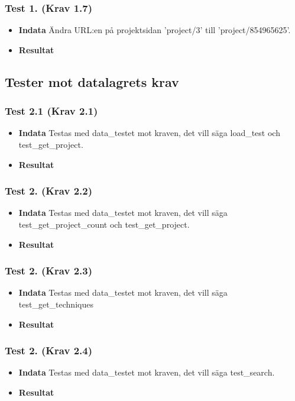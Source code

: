 \documentclass{TDP003mall}
\begin{document}
\subsubsection*{Test 1. (Krav 1.7)}
\begin{itemize}
\item[]\textbf{Indata} Ändra URL:en på projektsidan 'project/3' till 'project/854965625'.
\item[]\textbf{Resultat} 
\end{itemize}


\subsection{Tester mot datalagrets krav}
\subsubsection*{Test 2.1 (Krav 2.1)}
\begin{itemize}
\item[]\textbf{Indata} Testas med data\_testet mot kraven, det vill säga load\_test och test\_get\_project.
\item[]\textbf{Resultat} 
\end{itemize}
\subsubsection*{Test 2. (Krav 2.2)}
\begin{itemize}
\item[]\textbf{Indata} Testas med data\_testet mot kraven, det vill säga test\_get\_project\_count och test\_get\_project.
\item[]\textbf{Resultat} 
\end{itemize}
\subsubsection*{Test 2. (Krav 2.3)}
\begin{itemize}
\item[]\textbf{Indata} Testas med data\_testet mot kraven, det vill säga test\_get\_techniques
\item[]\textbf{Resultat} 
\end{itemize}
\subsubsection*{Test 2. (Krav 2.4)}
\begin{itemize}
\item[]\textbf{Indata} Testas med data\_testet mot kraven, det vill säga test\_search.
\item[]\textbf{Resultat} 
\end{itemize}
\end{document}
